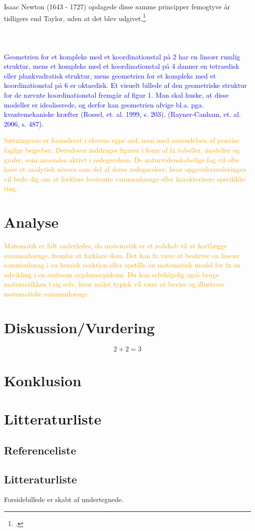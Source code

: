 \documentclass[12pt, a4paper]{article}
\begin{document}
Isaac Newton (1643 - 1727) opdagede disse samme principper femogtyve år tidligere end Taylor, uden at det blev udgivet.\footcite{roy_2021}\\
\\
\\
\\
\textcolor{blue}{Geometrien for et kompleks med et koordinationstal på 2 har en lineær rumlig struktur, mens et kompleks med et koordinationstal på 4 danner en tetraedisk eller plankvadratisk struktur, mens geometrien for et kompleks med et koordinationstal på 6 er oktaedisk. Et visuelt billede af den geometriske struktur for de nævnte koordinationstal fremgår af figur 1. Man skal huske, at disse modeller er idealiserede, og derfor kan geometrien afvige bl.a. pga. kvantemekaniske kræfter (Rossel, et. al. 1999, s. 203), (Rayner-Canham, et. al. 2006, s. 487).}

\textcolor{orange}{Sætningerne er formuleret i elevens egne ord, men med anvendelsen af præcise faglige begreber. Derudover inddrages figurer i form af fx tabeller, modeller og grafer, som anvendes aktivt i redegørelsen.
    De naturvidenskabelige fag vil ofte have et analytisk niveau som del af deres redegørelser, hvor opgaveformuleringen vil bede dig om at forklare bestemte sammenhænge eller karakterisere specifikke ting.}
\section{Analyse} %
\textcolor{orange}{Matematik er lidt anderledes, da matematik er et redskab til at kortlægge sammenhænge, fremfor at forklare dem. Det kan fx være at beskrive en lineær sammenhæng i en kemisk reaktion eller opstille en matematisk model for fx en udvikling i en smitsom sygdomsepidemi.  Du kan selvfølgelig også bruge matematikken i sig selv, hvor målet typisk vil være at bevise og illustrere matematiske sammenhænge.}
\section{Diskussion/Vurdering} %
\begin{equation}
    2+2=3
\end{equation}
\section{Konklusion} %

\section{Litteraturliste}
\subsection{Referenceliste}
\printbibliography
\subsection{Litteraturliste}
Forsidebillede er skabt af undertegnede.
\end{document}
